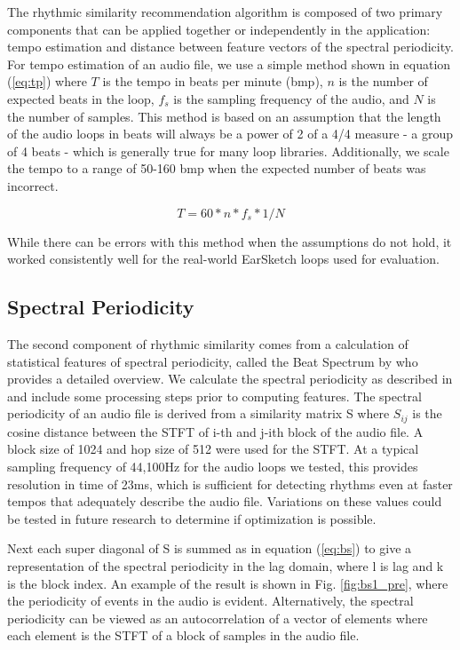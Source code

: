 \documentclass{article}
\begin{document}
The rhythmic similarity recommendation algorithm is composed of two primary components that can be applied together or independently in the application: tempo estimation and distance between feature vectors of the spectral periodicity. For tempo estimation of an audio file, we use a simple method shown in equation (\ref{eq:tp}) where \(T\) is the tempo in beats per minute (bmp), \(n\) is the number of expected beats in the loop, \(f_s\) is the sampling frequency of the audio, and \(N\) is the number of samples. This method is based on an assumption that the length of the audio loops in beats will always be a power of 2 of a 4/4 measure - a group of 4 beats - which is generally true for many loop libraries. Additionally, we scale the tempo to a range of 50-160 bmp when the expected number of beats was incorrect.

\begin{equation}
\label{eq:tp}
T = 60 * n * f_s * 1/N
\end{equation}

While there can be errors with this method when the assumptions do not hold, it worked consistently well for the real-world EarSketch \cite{earsketch} loops used for evaluation.

\subsection{Spectral Periodicity}

The second component of rhythmic similarity comes from a calculation of statistical features of spectral periodicity, called the Beat Spectrum by \cite{foote2001beat} who provides a detailed overview. We calculate the spectral periodicity as described in \cite{foote2001beat} and include some processing steps prior to computing features. The spectral periodicity of an audio file is derived from a similarity matrix S where \(S_{ij}\) is the cosine distance between the STFT of i-th and j-ith block of the audio file. A block size of 1024 and hop size of 512 were used for the STFT. At a typical sampling frequency of 44,100Hz for the audio loops we tested, this provides resolution in time of 23ms, which is sufficient for detecting rhythms even at faster tempos that adequately describe the audio file. Variations on these values could be tested in future research to determine if optimization is possible.

Next each super diagonal of S is summed as in equation (\ref{eq:bs}) to give a representation of the spectral periodicity in the lag domain, where l is lag and k is the block index. An example of the result is shown in Fig. \ref{fig:bs1_pre}, where the periodicity of events in the audio is evident. Alternatively, the spectral periodicity can be viewed as an autocorrelation of a vector of elements where each element is the STFT of a block of samples in the audio file.
\end{document}

